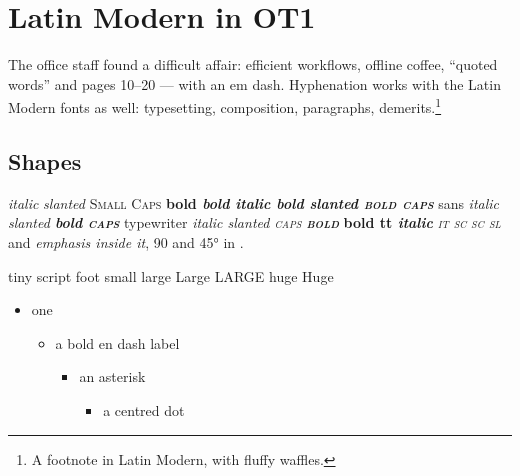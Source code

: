 \documentclass{article}
\begin{document}
\section{Latin Modern in OT1}
The office staff found a difficult affair: efficient workflows, offline coffee, ``quoted words'' and pages 10--20 --- with an em dash. Hyphenation works with the Latin Modern fonts as well: typesetting, composition, paragraphs, demerits.\footnote{A footnote in Latin Modern, with fluffy waffles.}

\subsection{Shapes}
{\itshape italic} {\slshape slanted} {\scshape Small Caps} {\bfseries bold \itshape bold italic \slshape bold slanted \scshape bold caps}
{\sffamily sans \itshape italic \slshape slanted \bfseries bold \scshape caps} {\ttfamily typewriter \itshape italic \slshape slanted \scshape caps \bfseries bold} {\ttfamily\bfseries bold tt \itshape italic}
{\itshape\scshape it sc} {\scshape\slshape sc sl} and \emph{emphasis \emph{inside} it}, 90\textdegree{} and 45° in .

{\tiny tiny} {\scriptsize script} {\footnotesize foot} {\small small} {\large large} {\Large Large} {\LARGE LARGE} {\huge huge} {\Huge Huge}

\begin{itemize}
\item one
  \begin{itemize}
  \item a bold en dash label
    \begin{itemize}
    \item an asterisk
      \begin{itemize}
      \item a centred dot
      \end{itemize}
    \end{itemize}
  \end{itemize}
\end{itemize}
\end{document}
